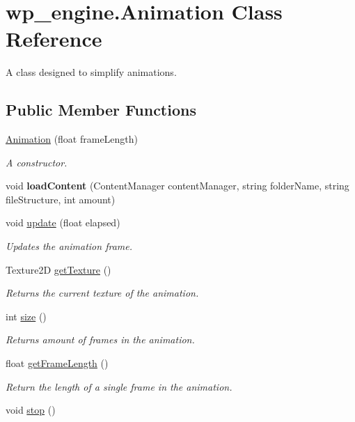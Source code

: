 \hypertarget{classwp__engine_1_1_animation}{\section{wp\-\_\-engine.\-Animation Class Reference}
\label{classwp__engine_1_1_animation}
}


A class designed to simplify animations.  


\subsection*{Public Member Functions}
\begin{DoxyCompactItemize}
\item 
\hyperlink{classwp__engine_1_1_animation_a4e886afeba32e2578fd95e0b0f8a81cd}{Animation} (float frame\-Length)
\begin{DoxyCompactList}\small\item\em A constructor. \end{DoxyCompactList}\item 
\hypertarget{classwp__engine_1_1_animation_a52d2e541f25648623e8832d39547f25c}{void {\bfseries load\-Content} (Content\-Manager content\-Manager, string folder\-Name, string file\-Structure, int amount)}\label{classwp__engine_1_1_animation_a52d2e541f25648623e8832d39547f25c}

\item 
void \hyperlink{classwp__engine_1_1_animation_a08b58e15e94d72e16f67759817bd2179}{update} (float elapsed)
\begin{DoxyCompactList}\small\item\em Updates the animation frame. \end{DoxyCompactList}\item 
Texture2\-D \hyperlink{classwp__engine_1_1_animation_a818f24093e3cb5b7f2992094ca6f02bf}{get\-Texture} ()
\begin{DoxyCompactList}\small\item\em Returns the current texture of the animation. \end{DoxyCompactList}\item 
int \hyperlink{classwp__engine_1_1_animation_ad87a7bf52f4211929933731375f1cd1f}{size} ()
\begin{DoxyCompactList}\small\item\em Returns amount of frames in the animation. \end{DoxyCompactList}\item 
float \hyperlink{classwp__engine_1_1_animation_a2f6cb41af7cf180d9e0d3736e2f5f0f8}{get\-Frame\-Length} ()
\begin{DoxyCompactList}\small\item\em Return the length of a single frame in the animation. \end{DoxyCompactList}\item 
\hypertarget{classwp__engine_1_1_animation_af8859a8b058c0506830f8a0b17962ef1}{void \hyperlink{classwp__engine_1_1_animation_af8859a8b058c0506830f8a0b17962ef1}{stop} ()}\label{classwp__engine_1_1_animation_af8859a8b058c0506830f8a0b17962ef1}


\end{DoxyCompactItemize}
